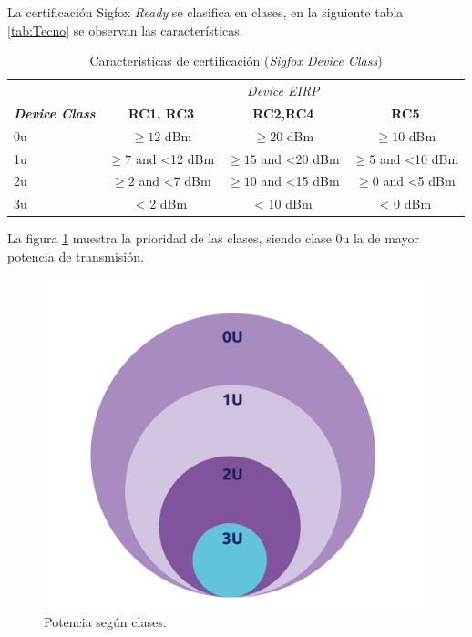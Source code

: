 La certificación Sigfox \textit{Ready} se clasifica en clases, en la  siguiente tabla \ref{tab:Tecno} se observan las características.
\begin{table}[h]
	\centering
	\caption[Sigfox \textit{Ready}]{Caracteristicas de certificación (\textit{Sigfox Device Class}) }
	\begin{tabular}{l c c c}    
		\toprule
		\textbf{  } & \multicolumn{3}{c}{\textit{Device EIRP}} \\ \cline{2-4} 
		\textbf{ \textit{Device Class} } & \textbf{RC1, RC3} & \textbf{RC2,RC4} 	& \textbf{RC5} \\
		\midrule
		0u	    &$\ge12$ dBm 	&$\ge20$ dBm & $\ge10$ dBm \\	
		1u	&$\ge7$ and <12 dBm &$\ge15$ and <20 dBm & $\ge5$ and <10 dBm\\
		2u	&$\ge2$ and <7 dBm & $\ge10$ and <15 dBm & $\ge0$ and <5 dBm \\	
		3u	&< 2 dBm &< 10 dBm &< 0 dBm   \\
		\bottomrule
		\hline
	\end{tabular}
	\label{tab:ZonasSigfox}
\end{table}

La figura \ref{fig:certificacion} muestra la prioridad de las clases, siendo clase 0u la de mayor potencia de transmisión.
\begin{figure}[h]
	\centering
	\includegraphics[scale=.65]{./Figures/certificacion.PNG}
	\caption{Potencia según clases.}
	\label{fig:certificacion}
\end{figure}

